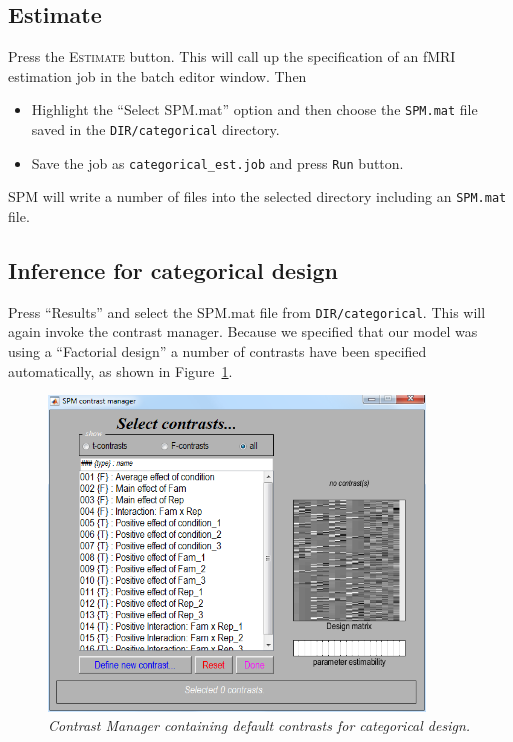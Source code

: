 \subsection{Estimate}

Press the \textsc{Estimate} button. This will call up the specification of an fMRI estimation job in the batch editor window. Then
\begin{itemize}
\item Highlight the ``Select SPM.mat'' option and then choose the \texttt{SPM.mat} file saved in the \texttt{DIR/categorical} directory.
\item Save the job as \texttt{categorical\_est.job} and press \texttt{Run} button.
\end{itemize}
SPM will write a number of files into the selected directory including an \texttt{SPM.mat} file.

\subsection{Inference for categorical design}

Press ``Results'' and select the SPM.mat file from \texttt{DIR/categorical}. This will again invoke the contrast manager. Because we specified that our model was using a ``Factorial design'' a number of contrasts have been specified automatically, as shown in Figure~\ref{cat_contrasts}.
\begin{figure}
\begin{center}
\includegraphics[width=100mm]{faces/cat_contrasts}
\caption{\em Contrast Manager containing default contrasts for categorical design. \label{cat_contrasts}}
\end{center}
\end{figure}

